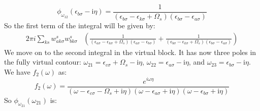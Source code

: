 \documentclass[12pt]{article}
\begin{document}
\begin{equation}
\boxed{\phi_{\omega_{12}}(\epsilon_{b \sigma} - \mathrm{i} \eta) = \frac{1}{(\epsilon_{b \sigma} -\epsilon_{k \sigma}+\Omega_s)(\epsilon_{b \sigma} -\epsilon_{a \sigma})}}
\end{equation}
So the first term of the integral will be given by:
\begin{equation}
\begin{aligned}
2\pi i \sum_{ks} w_{a k \sigma}^s w_{b k \sigma}^s & \left( \frac{1}{(\epsilon_{a \sigma} -\epsilon_{k \sigma}+\Omega_s)(\epsilon_{a \sigma} -\epsilon_{b \sigma})} + \frac{1}{(\epsilon_{b \sigma} -\epsilon_{k \sigma}+\Omega_s)(\epsilon_{b \sigma} -\epsilon_{a \sigma})} \right)
\end{aligned}
\end{equation}
We move on to the second integral in the virtual block. It has now three poles in the fully virtual contour: $\omega_{21} = \epsilon _{c\sigma } + \Omega_s - \mathrm{i} \eta$, $\omega_{22} = \epsilon _{a\sigma } - \mathrm{i} \eta$, and $\omega_{23} = \epsilon _{b\sigma } - \mathrm{i} \eta$. We have $f_2(\omega)$ as:
\begin{equation}
f_2(\omega) = \frac{e^{i\omega \eta }}{(\omega-\epsilon_{c \sigma}-\Omega_s+\mathrm{i} \eta)(\omega-\epsilon_{a \sigma}+\mathrm{i} \eta)(\omega-\epsilon_{b \sigma}+\mathrm{i} \eta)}
\end{equation}
So $\phi_{\omega_{21}}(\omega _{21})$ is:
\end{document}
